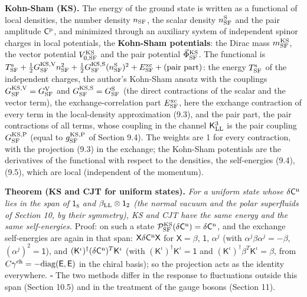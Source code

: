 \documentclass[
  10pt,
]{article}
\begin{document}
\textbf{Kohn-Sham (KS).} The energy of the ground state is written as a
functional of local densities, the number density \(n_{\rm SF}\), the
scalar density \(n^{\rm S}_{\rm SF}\) and the pair amplitude
\(\mathsf C^{\rm p}\), and minimized through an auxiliary system of
independent spinor charges in local potentials, the \textbf{Kohn-Sham
potentials}: the Dirac mass \(m^{\rm KS}_{\rm SF}\), the vector
potential \(V^{\rm KS}_{0,{\rm SF}}\) and the pair potential
\(\vec\Phi^{\rm KS}_{\rm SF}\). The functional is
\(T^{\rm s}_{\rm SF}+\tfrac12G^{\rm KS,V}_{\rm SF}n_{\rm SF}^2+\tfrac12G^{\rm KS,S}_{\rm SF}(n^{\rm S}_{\rm SF})^2+E^{\rm xc}_{\rm SF}+(\text{pair part})\):
the energy \(T^{\rm s}_{\rm SF}\) of the independent charges, the
author's Kohn-Sham ansatz with the couplings
\(G^{\rm KS,V}_{\rm SF}=G^{\rm V}_{\rm SF}\) and
\(G^{\rm KS,S}_{\rm SF}=G^{\rm S}_{\rm SF}\) (the direct contractions of
the scalar and the vector term), the exchange-correlation part
\(E^{\rm xc}_{\rm SF}\), here the exchange contraction of every term in
the local-density approximation (9.3), and the pair part, the pair
contractions of all terms, whose coupling in the channel
\(\mathsf K^3_{\rm LL}\) is the pair coupling \(G^{\rm KS,P}_{\rm SF}\)
(equal to \(g^{{\rm KS},{\rm P}}_{\rm SF}\) of Section 9.4). The weights
are 1 for every contraction, with the projection (9.3) in the exchange;
the Kohn-Sham potentials are the derivatives of the functional with
respect to the densities, the self-energies (9.4), (9.5), which are
local (independent of the momentum).

\textbf{Theorem (KS and CJT for uniform states).} \emph{For a uniform
state whose \(\delta\mathsf C^{\rm n}\) lies in the span of
\(\mathsf 1_8\) and \(\beta_{\rm LL}\otimes\mathsf 1_2\) (the normal
vacuum and the polar superfluids of Section 10, by their symmetry), KS
and CJT have the same energy and the same self-energies.} Proof: on such
a state
\(\mathcal P^{\rm KS}_{\rm SF}(\delta\mathsf C^{\rm n})=\delta\mathsf C^{\rm n}\),
and the exchange self-energies are again in that span:
\(\mathsf X\delta\mathsf C^{\rm n}\mathsf X\) for \(\mathsf X=\beta\),
\(\mathsf 1\), \(\alpha^j\) (with \(\alpha^j\beta\alpha^j=-\beta\),
\((\alpha^j)^2=\mathsf 1\)), and
\((\mathsf K^\iota)^\dagger(\delta\mathsf C^{\rm n})^T\mathsf K^\iota\)
(with \((\mathsf K^\iota)^\dagger\mathsf K^\iota=\mathsf 1\) and
\((\mathsf K^\iota)^\dagger\beta^T\mathsf K^\iota=\beta\), from
\(C\gamma^{\rm ch}=-\mathrm{diag}(\mathsf E,\mathsf E)\) in the chiral
basis); so the projection acts as the identity everywhere. \(\square\)
The two methods differ in the response to fluctuations outside this span
(Section 10.5) and in the treatment of the gauge bosons (Section 11).
\end{document}
